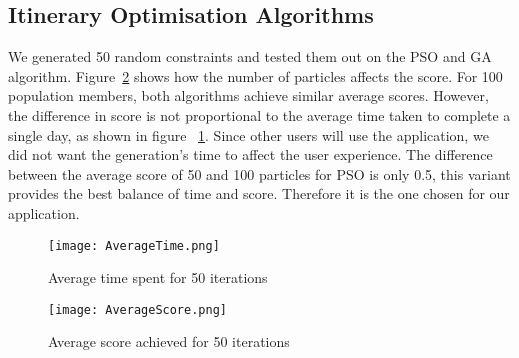 \subsection{Itinerary Optimisation Algorithms}

We generated 50 random constraints and tested them out
on the PSO and GA algorithm. Figure~\ref{AverageScore} shows how the number of
particles affects the score. For 100 population
members, both algorithms achieve similar average
scores. However, the difference in score is not
proportional to the average time taken to complete a
single day, as shown in figure ~\ref{AverageTime}. Since other users will use
the application, we did not
want the generation's time to affect the user
experience. The difference between the average
score of 50 and 100 particles for PSO is only 0.5,
this variant provides the best balance of time and
score. Therefore it is the one chosen for our
application.   


\begin{figure}[h]
\centering
\texttt{[image: AverageTime.png]}
\caption{Average time spent for 50 iterations}
\label{AverageTime}
\end{figure}

\begin{figure}[h]
\centering
\texttt{[image: AverageScore.png]}
\caption{Average score achieved for 50 iterations}
\label{AverageScore}
\end{figure}

